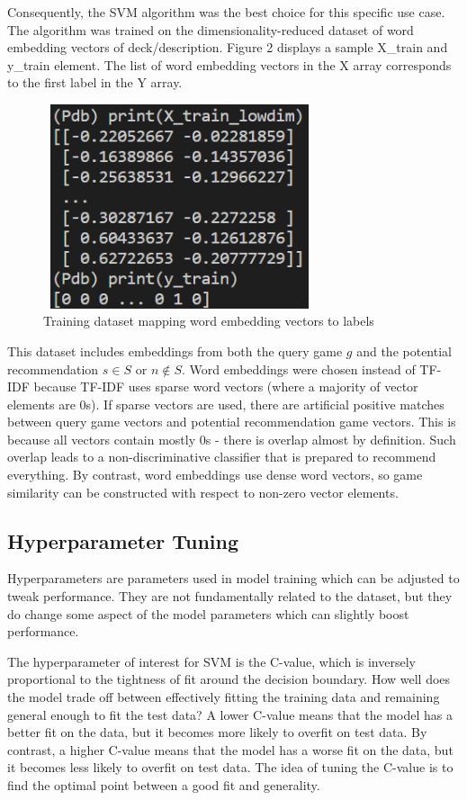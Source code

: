 \documentclass[10pt,twocolumn]{article}
\begin{document}
Consequently, the SVM algorithm was the best choice for this specific use case. The algorithm was trained on the dimensionality-reduced dataset of word embedding vectors of deck/description. Figure 2 displays a sample X\_train and y\_train element. The list of word embedding vectors in the X array corresponds to the first label in the Y array. 

\begin{figure}[h!]
\includegraphics[width=8cm, height=6cm]{train_set_img.PNG}
\centering
\caption{Training dataset mapping word embedding vectors to labels}
\end{figure}

This dataset includes embeddings from both the query game $g$ and the potential recommendation $s \in S$ or $n \not\in S$. Word embeddings were chosen instead of TF-IDF because TF-IDF uses sparse word vectors (where a majority of vector elements are 0s). If sparse vectors are used, there are artificial positive matches between query game vectors and potential recommendation game vectors. This is because all vectors contain mostly 0s - there is overlap almost by definition. Such overlap leads to a non-discriminative classifier that is prepared to recommend everything. By contrast, word embeddings use dense word vectors, so game similarity can be constructed with respect to non-zero vector elements. 

\subsection{Hyperparameter Tuning}
Hyperparameters are parameters used in model training which can be adjusted to tweak performance. They are not fundamentally related to the dataset, but they do change some aspect of the model parameters which can slightly boost performance. 

The hyperparameter of interest for SVM is the C-value, which is inversely proportional to the tightness of fit around the decision boundary. How well does the model trade off between effectively fitting the training data and remaining general enough to fit the test data? A lower C-value means that the model has a better fit on the data, but it becomes more likely to overfit on test data. By contrast, a higher C-value means that the model has a worse fit on the data, but it becomes less likely to overfit on test data. The idea of tuning the C-value is to find the optimal point between a good fit and generality.
\end{document}
